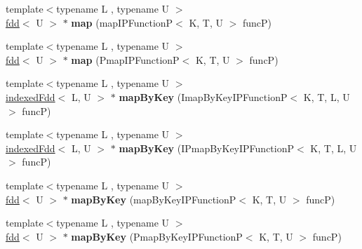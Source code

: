 \begin{DoxyCompactItemize}
\item 
\hypertarget{classfaster_1_1indexedFdd_3_01K_00_01T_01_5_01_4_a1feea9d9d94fa8dfec742d3c7a5c78f3}{}{\footnotesize template$<$typename L , typename U $>$ }\\\hyperlink{classfaster_1_1fdd}{fdd}$<$ U $>$ $\ast$ {\bfseries map} (map\+I\+P\+Function\+P$<$ K, T, U $>$ func\+P)\label{classfaster_1_1indexedFdd_3_01K_00_01T_01_5_01_4_a1feea9d9d94fa8dfec742d3c7a5c78f3}

\item 
\hypertarget{classfaster_1_1indexedFdd_3_01K_00_01T_01_5_01_4_a24e59e4384848977c9b4210f83246955}{}{\footnotesize template$<$typename L , typename U $>$ }\\\hyperlink{classfaster_1_1fdd}{fdd}$<$ U $>$ $\ast$ {\bfseries map} (Pmap\+I\+P\+Function\+P$<$ K, T, U $>$ func\+P)\label{classfaster_1_1indexedFdd_3_01K_00_01T_01_5_01_4_a24e59e4384848977c9b4210f83246955}

\item 
\hypertarget{classfaster_1_1indexedFdd_3_01K_00_01T_01_5_01_4_ae149988f4e281c18df0565cc315933ad}{}{\footnotesize template$<$typename L , typename U $>$ }\\\hyperlink{classfaster_1_1indexedFdd}{indexed\+Fdd}$<$ L, U $>$ $\ast$ {\bfseries map\+By\+Key} (Imap\+By\+Key\+I\+P\+Function\+P$<$ K, T, L, U $>$ func\+P)\label{classfaster_1_1indexedFdd_3_01K_00_01T_01_5_01_4_ae149988f4e281c18df0565cc315933ad}

\item 
\hypertarget{classfaster_1_1indexedFdd_3_01K_00_01T_01_5_01_4_aaf721efd428dd2c7bbf748b8add0054e}{}{\footnotesize template$<$typename L , typename U $>$ }\\\hyperlink{classfaster_1_1indexedFdd}{indexed\+Fdd}$<$ L, U $>$ $\ast$ {\bfseries map\+By\+Key} (I\+Pmap\+By\+Key\+I\+P\+Function\+P$<$ K, T, L, U $>$ func\+P)\label{classfaster_1_1indexedFdd_3_01K_00_01T_01_5_01_4_aaf721efd428dd2c7bbf748b8add0054e}

\item 
\hypertarget{classfaster_1_1indexedFdd_3_01K_00_01T_01_5_01_4_a0a02cf2c645ba2aa782ddba70c37e92c}{}{\footnotesize template$<$typename L , typename U $>$ }\\\hyperlink{classfaster_1_1fdd}{fdd}$<$ U $>$ $\ast$ {\bfseries map\+By\+Key} (map\+By\+Key\+I\+P\+Function\+P$<$ K, T, U $>$ func\+P)\label{classfaster_1_1indexedFdd_3_01K_00_01T_01_5_01_4_a0a02cf2c645ba2aa782ddba70c37e92c}

\item 
\hypertarget{classfaster_1_1indexedFdd_3_01K_00_01T_01_5_01_4_a85e5688a87090e41f9a4d1b6c37f63c2}{}{\footnotesize template$<$typename L , typename U $>$ }\\\hyperlink{classfaster_1_1fdd}{fdd}$<$ U $>$ $\ast$ {\bfseries map\+By\+Key} (Pmap\+By\+Key\+I\+P\+Function\+P$<$ K, T, U $>$ func\+P)\label{classfaster_1_1indexedFdd_3_01K_00_01T_01_5_01_4_a85e5688a87090e41f9a4d1b6c37f63c2}


\end{DoxyCompactItemize}
